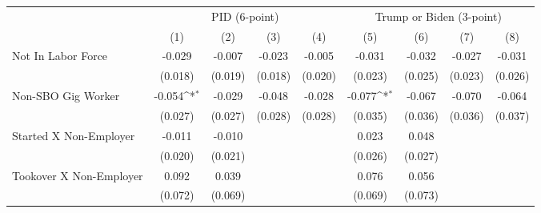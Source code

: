 {
\def\sym#1{\ifmmode^{#1}\else\(^{#1}\)\fi}
\begin{tabular}{l*{8}{c}}
\hline\hline
                    &\multicolumn{4}{c}{PID (6-point)}                                                      &\multicolumn{4}{c}{Trump or Biden (3-point)}                                           \\
                    &\multicolumn{1}{c}{(1)}         &\multicolumn{1}{c}{(2)}         &\multicolumn{1}{c}{(3)}         &\multicolumn{1}{c}{(4)}         &\multicolumn{1}{c}{(5)}         &\multicolumn{1}{c}{(6)}         &\multicolumn{1}{c}{(7)}         &\multicolumn{1}{c}{(8)}         \\
\hline
Not In Labor Force  &      -0.029         &      -0.007         &      -0.023         &      -0.005         &      -0.031         &      -0.032         &      -0.027         &      -0.031         \\
                    &     (0.018)         &     (0.019)         &     (0.018)         &     (0.020)         &     (0.023)         &     (0.025)         &     (0.023)         &     (0.026)         \\
Non-SBO Gig Worker  &      -0.054\sym{*}  &      -0.029         &      -0.048         &      -0.028         &      -0.077\sym{*}  &      -0.067         &      -0.070         &      -0.064         \\
                    &     (0.027)         &     (0.027)         &     (0.028)         &     (0.028)         &     (0.035)         &     (0.036)         &     (0.036)         &     (0.037)         \\
Started X Non-Employer&      -0.011         &      -0.010         &                     &                     &       0.023         &       0.048         &                     &                     \\
                    &     (0.020)         &     (0.021)         &                     &                     &     (0.026)         &     (0.027)         &                     &                     \\
Tookover X Non-Employer&       0.092         &       0.039         &                     &                     &       0.076         &       0.056         &                     &                     \\
                    &     (0.072)         &     (0.069)         &                     &                     &     (0.069)         &     (0.073)         &                     &                     \\

\end{tabular}}
